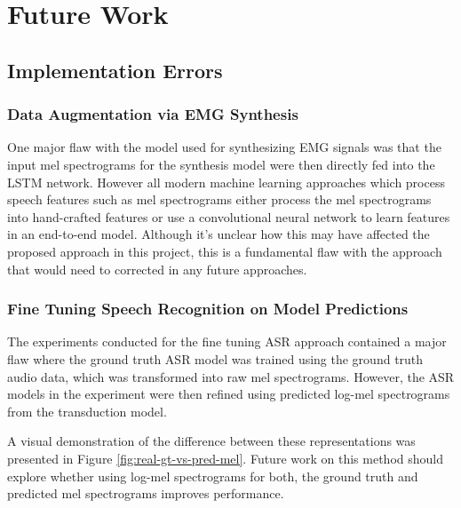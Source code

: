 \chapter{Future Work} \label{chap:future-work}

\section{Implementation Errors}

\subsection{Data Augmentation via EMG Synthesis}

One major flaw with the model used for synthesizing EMG signals
was that the input mel spectrograms for the synthesis model were
then directly fed into the LSTM network. However all modern
machine learning approaches which process speech features such as
mel spectrograms either process the mel spectrograms into hand-crafted
features or use a convolutional neural network to learn features
in an end-to-end model. Although it's unclear how this may have affected
the proposed approach in this project, this is a fundamental flaw with
the approach that would need to corrected in any future approaches.

\subsection{Fine Tuning Speech Recognition on Model Predictions}

The experiments conducted for the fine tuning ASR approach contained
a major flaw where the ground truth ASR model was trained using
the ground truth audio data, which was transformed into raw mel spectrograms.
However, the ASR models in the experiment were then
refined using predicted log-mel spectrograms from the transduction model.

A visual demonstration of the difference between these representations
was presented in Figure \ref{fig:real-gt-vs-pred-mel}. Future work
on this method should explore whether using log-mel spectrograms for
both, the ground truth and predicted mel spectrograms improves performance.